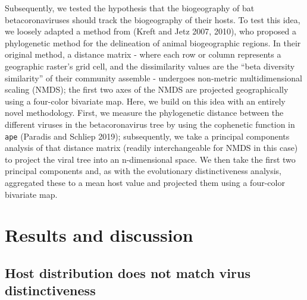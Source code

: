 \documentclass[10pt,oneside]{article}
\begin{document}
Subsequently, we tested the hypothesis that the biogeography of bat
betacoronaviruses should track the biogeography of their hosts. To test
this idea, we loosely adapted a method from (Kreft and Jetz 2007, 2010),
who proposed a phylogenetic method for the delineation of animal
biogeographic regions. In their original method, a distance matrix -
where each row or column represents a geographic raster's grid cell, and
the dissimilarity values are the ``beta diversity similarity'' of their
community assemble - undergoes non-metric multidimensional scaling
(NMDS); the first two axes of the NMDS are projected geographically
using a four-color bivariate map. Here, we build on this idea with an
entirely novel methodology. First, we measure the phylogenetic distance
between the different viruses in the betacoronavirus tree by using the
cophenetic function in \texttt{ape} (Paradis and Schliep 2019);
subsequently, we take a principal components analysis of that distance
matrix (readily interchangeable for NMDS in this case) to project the
viral tree into an n-dimensional space. We then take the first two
principal components and, as with the evolutionary distinctiveness
analysis, aggregated these to a mean host value and projected them using
a four-color bivariate map.

\hypertarget{results-and-discussion}{%
\section{Results and discussion}\label{results-and-discussion}}

\hypertarget{host-distribution-does-not-match-virus-distinctiveness}{%
\subsection{Host distribution does not match virus
distinctiveness}\label{host-distribution-does-not-match-virus-distinctiveness}}
\end{document}

